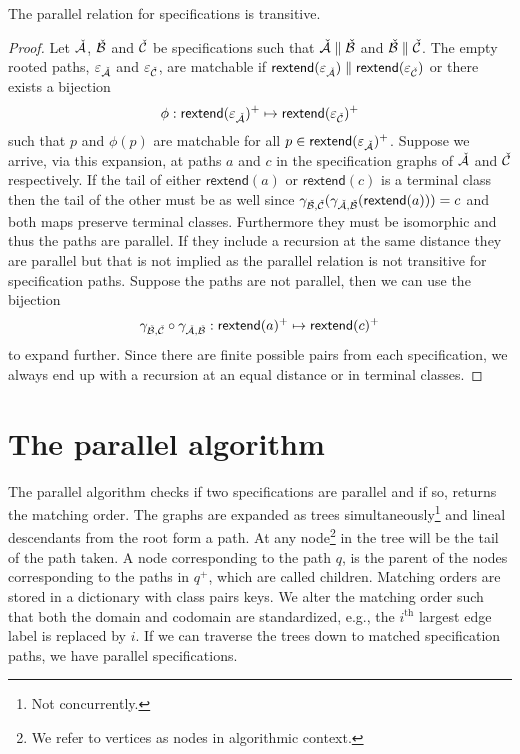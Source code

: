 \begin{proposition}
The parallel relation for specifications is transitive.
\end{proposition}
\begin{proof}
Let $\check{\mathcal{A}}$, $\check{\mathcal{B}}$ and $\check{\mathcal{C}}$ be specifications such that $\check{\mathcal{A}} \parallel\check{\mathcal{B}}$ and $\check{\mathcal{B}} \parallel \check{\mathcal{C}}$. The empty rooted paths, $\varepsilon_{\check{\mathcal{A}}}$ and $\varepsilon_{\check{\mathcal{C}}}$, are matchable if $\textsf{rextend}(\varepsilon_{\check{\mathcal{A}}}) \parallel \textsf{rextend}(\varepsilon_{\check{\mathcal{C}}})$ or there exists a bijection
\[
    \phi: \textsf{rextend}(\varepsilon_{\check{\mathcal{A}}})^+ \mapsto \textsf{rextend}(\varepsilon_{\check{\mathcal{C}}})^+
\]
such that $p$ and $\phi(p)$ are matchable for all $p \in \textsf{rextend}(\varepsilon_{\check{\mathcal{A}}})^+$. Suppose we arrive, via this expansion, at paths $a$ and $c$ in the specification graphs of $\check{\mathcal{A}}$ and $\check{\mathcal{C}}$ respectively. If the tail of either $\textsf{rextend}(a)$ or $\textsf{rextend}(c)$ is a terminal class then the tail of the other must be as well since $\gamma_{\check{\mathcal{B}},\check{\mathcal{C}}}(\gamma_{\check{\mathcal{A}},\check{\mathcal{B}}}(\textsf{rextend}(a))) = c$ and both maps preserve terminal classes. Furthermore they must be isomorphic and thus the paths are parallel. If they include a recursion at the same distance they are parallel but that is not implied as the parallel relation is not transitive for specification paths. Suppose the paths are not parallel, then we can use the bijection
\[
    \gamma_{\check{\mathcal{B}},\check{\mathcal{C}}} \circ \gamma_{\check{\mathcal{A}},\check{\mathcal{B}}}: \textsf{rextend}(a)^+ \mapsto \textsf{rextend}(c)^+
\]
to expand further. Since there are finite possible pairs from each specification, we always end up with a recursion at an equal distance or in terminal classes.
\end{proof}



\section{The parallel algorithm}\label{sec:paralg}
The parallel algorithm checks if two specifications are parallel and if so, returns the matching order. The graphs are expanded as trees simultaneously\footnote{Not concurrently.} and lineal descendants from the root form a path. At any node\footnote{We refer to vertices as nodes in algorithmic context.} in the tree will be the tail of the path taken. A node corresponding to the path $q$, is the parent of the nodes corresponding to the paths in $q^+$, which are called children. Matching orders are stored in a dictionary with class pairs keys. We alter the matching order such that both the domain and codomain are standardized, e.g., the $i^\text{th}$ largest edge label is replaced by $i$. If we can traverse the trees down to matched specification paths, we have parallel specifications.

